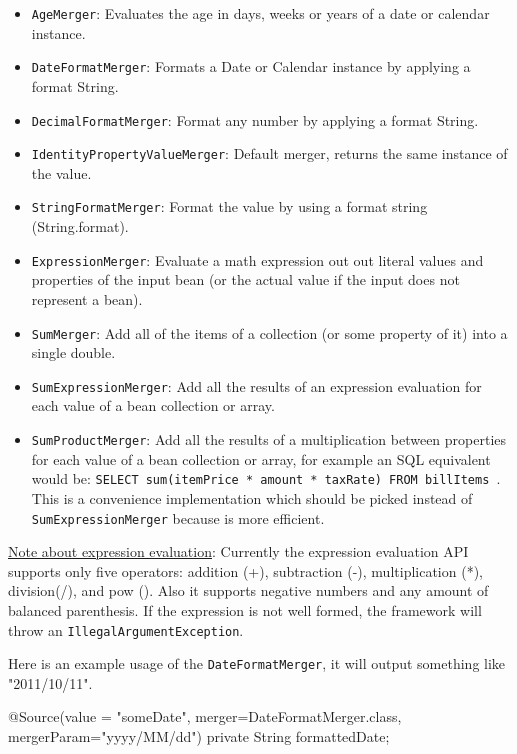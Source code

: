 \documentclass[11pt]{article}
\begin{document}
\begin{itemize}
 \item \texttt{AgeMerger}: Evaluates the age in days, weeks or years of a date or calendar instance.
 \item \texttt{DateFormatMerger}: Formats a Date or Calendar instance by applying a format String.
 \item \texttt{DecimalFormatMerger}: Format any number by applying a format String.
 \item \texttt{IdentityPropertyValueMerger}: Default merger, returns the same instance of the value.
 \item \texttt{StringFormatMerger}: Format the value by using a format string (String.format).
 \item \texttt{ExpressionMerger}: Evaluate a math expression out out literal values and properties of the input bean (or the actual value if the input does not represent a bean).
 \item \texttt{SumMerger}: Add all of the items of a collection (or some property of it) into a single double.
 \item \texttt{SumExpressionMerger}: Add all the results of an expression evaluation for each value of a bean collection or array.
 \item \texttt{SumProductMerger}: Add all the results of a multiplication between properties for each value of a bean collection or array, for example an SQL equivalent would be: \texttt{SELECT sum(itemPrice * amount * taxRate) FROM billItems }. This is a convenience implementation which should be picked instead of \texttt{SumExpressionMerger} because is more efficient.
\end{itemize}

\underline{Note about expression evaluation}: Currently the expression evaluation API supports only five operators: addition (+), subtraction (-), multiplication (*), division(/), and pow (). Also it supports negative numbers and any amount of balanced parenthesis. If the expression is not well formed, the framework will throw an \texttt{IllegalArgumentException}.

Here is an example usage of the \texttt{DateFormatMerger}, it will output something like "2011/10/11".


\begin{java}
@Source(value = "someDate", 
    merger=DateFormatMerger.class, mergerParam="yyyy/MM/dd")
private String formattedDate;
\end{java}
\end{document}
